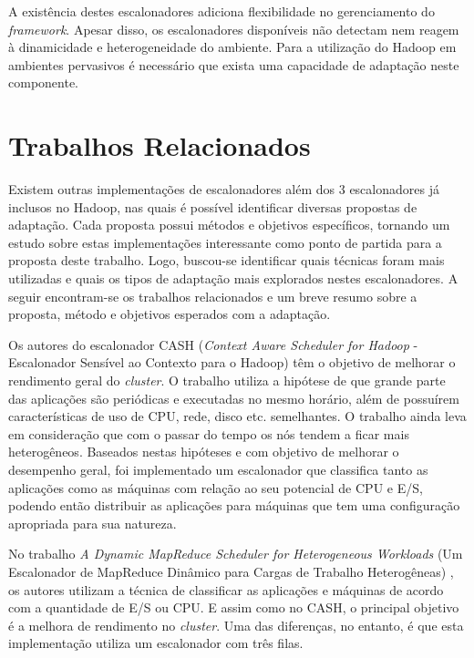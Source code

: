 A existência destes escalonadores adiciona flexibilidade no gerenciamento do \textit{framework}. Apesar disso, os escalonadores disponíveis não detectam nem reagem à dinamicidade e heterogeneidade do ambiente. Para a utilização do Hadoop em ambientes pervasivos é necessário que exista uma capacidade de adaptação neste componente.





\section{Trabalhos Relacionados}
Existem outras implementações de escalonadores além dos 3 escalonadores já inclusos no Hadoop, nas quais é possível identificar diversas propostas de adaptação. Cada proposta possui métodos e objetivos específicos, tornando um estudo sobre estas implementações interessante como ponto de partida para a proposta deste trabalho. Logo, buscou-se identificar quais técnicas foram mais utilizadas e quais os tipos de adaptação mais explorados nestes escalonadores. A seguir encontram-se os trabalhos relacionados e um breve resumo sobre a proposta, método e objetivos esperados com a adaptação.


Os autores do escalonador CASH (\emph{Context Aware Scheduler for Hadoop} - Escalonador Sensível ao Contexto para o Hadoop) \cite{CASH} têm o objetivo de melhorar o rendimento geral do \emph{cluster}. O trabalho utiliza a hipótese de que grande parte das aplicações são periódicas e executadas no mesmo horário, além de possuírem características de uso de CPU, rede, disco etc. semelhantes. O trabalho ainda leva em consideração que com o passar do tempo os nós tendem a ficar mais heterogêneos. Baseados nestas hipóteses e com objetivo de melhorar o desempenho geral, foi implementado um escalonador que classifica tanto as aplicações como as máquinas com relação ao seu potencial de CPU e E/S, podendo então distribuir as aplicações para máquinas que tem uma configuração apropriada para sua natureza.

No trabalho \textit{A Dynamic MapReduce Scheduler for Heterogeneous Workloads} (Um Escalonador de MapReduce Dinâmico para Cargas de Trabalho Heterogêneas) \cite{DMRSHW}, os autores utilizam a técnica de classificar as aplicações e máquinas de acordo com a quantidade de E/S ou CPU. E assim como no CASH, o principal objetivo é a melhora de rendimento no \textit{cluster}. Uma das diferenças, no entanto, é que esta implementação utiliza um escalonador com três filas.

